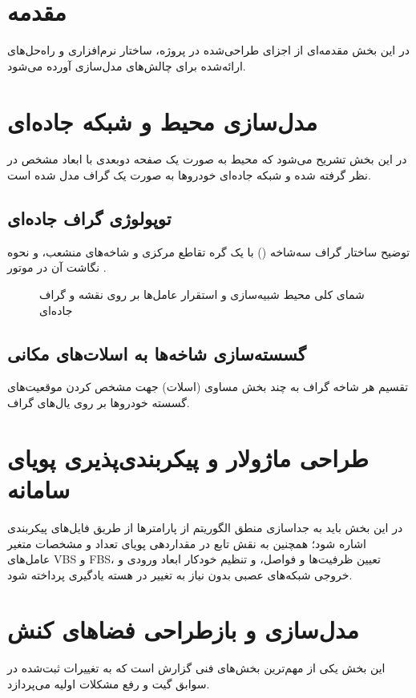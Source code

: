 \documentclass[a4paper,12pt,oneside]{report}
\begin{document}
\section{مقدمه}
در این بخش مقدمه‌ای از اجزای طراحی‌شده در پروژه، ساختار نرم‌افزاری و راه‌حل‌های ارائه‌شده برای چالش‌های مدل‌سازی آورده می‌شود.

\section{مدل‌سازی محیط و شبکه جاده‌ای}
در این بخش تشریح می‌شود که محیط به صورت یک صفحه دوبعدی با ابعاد مشخص در نظر گرفته شده و شبکه جاده‌ای خودروها به صورت یک گراف مدل شده است.


\subsection{توپولوژی گراف جاده‌ای}
توضیح ساختار گراف سه‌شاخه () با یک گره تقاطع مرکزی و شاخه‌های منشعب، و نحوه نگاشت آن در موتور .

\begin{figure}[H]
    \centering
    \caption{شمای کلی محیط شبیه‌سازی و استقرار عامل‌ها بر روی نقشه و گراف جاده‌ای}
    \label{fig:env_topology}
\end{figure}

\subsection{گسسته‌سازی شاخه‌ها به اسلات‌های مکانی}
تقسیم هر شاخه گراف به چند بخش مساوی (اسلات) جهت مشخص کردن موقعیت‌های گسسته خودروها بر روی یال‌های گراف.

\section{طراحی ماژولار و پیکربندی‌پذیری پویای سامانه}
در این بخش باید به جداسازی منطق الگوریتم از پارامترها از طریق فایل‌های پیکربندی  اشاره شود؛ همچنین به نقش تابع  در مقداردهی پویای تعداد و مشخصات متغیر عامل‌های VBS و FBS، تعیین ظرفیت‌ها و فواصل، و تنظیم خودکار ابعاد ورودی و خروجی شبکه‌های عصبی بدون نیاز به تغییر در هسته یادگیری پرداخته شود.


\section{مدل‌سازی و بازطراحی فضاهای کنش}
این بخش یکی از مهم‌ترین بخش‌های فنی گزارش است که به تغییرات ثبت‌شده در سوابق گیت و رفع مشکلات اولیه می‌پردازد.
\end{document}
